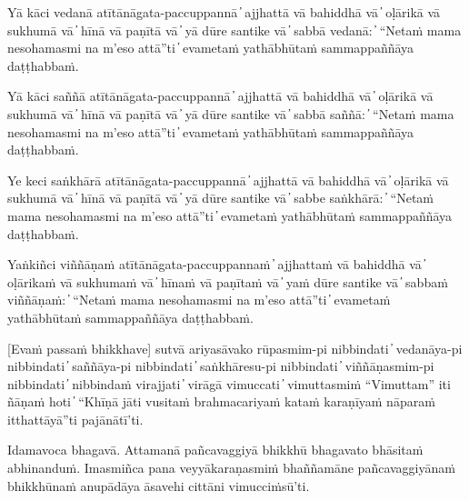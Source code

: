 Yā kāci vedanā atītānāgata-paccuppannā  ̓  ajjhattā vā bahiddhā vā  ̓  oḷārikā vā sukhumā vā  ̓  hīnā vā paṇītā vā  ̓  yā dūre santike vā  ̓  sabbā vedanā:  ̓  “Netaṁ mama nesohamasmi na m’eso attā”ti  ̓  evametaṁ yathābhūtaṁ sammappaññāya daṭṭhabbaṁ.

Yā kāci saññā atītānāgata-paccuppannā  ̓  ajjhattā vā bahiddhā vā  ̓  oḷārikā vā sukhumā vā  ̓  hīnā vā paṇītā vā  ̓  yā dūre santike vā  ̓  sabbā saññā:  ̓  “Netaṁ mama nesohamasmi na m’eso attā”ti  ̓  evametaṁ yathābhūtaṁ sammappaññāya daṭṭhabbaṁ.

Ye keci saṅkhārā atītānāgata-paccuppannā  ̓  ajjhattā vā bahiddhā vā  ̓  oḷārikā vā sukhumā vā  ̓  hīnā vā paṇītā vā  ̓  yā dūre santike vā  ̓  sabbe saṅkhārā:  ̓  “Netaṁ mama nesohamasmi na m’eso attā”ti  ̓  evametaṁ yathābhūtaṁ sammappaññāya daṭṭhabbaṁ.

Yaṅkiñci viññāṇaṁ atītānāgata-paccuppannaṁ  ̓  ajjhattaṁ vā bahiddhā vā  ̓  oḷārikaṁ vā sukhumaṁ vā  ̓  hīnaṁ vā paṇītaṁ vā  ̓  yaṁ dūre santike vā  ̓  sabbaṁ viññāṇaṁ:  ̓  “Netaṁ mama nesohamasmi na m’eso attā”ti  ̓  evametaṁ yathābhūtaṁ sammappaññāya daṭṭhabbaṁ.

[Evaṁ passaṁ bhikkhave] sutvā ariyasāvako rūpasmim-pi nibbindati  ̓  vedanāya-pi nibbindati  ̓  saññāya-pi nibbindati  ̓  saṅkhāresu-pi nibbindati  ̓  viññāṇasmim-pi nibbindati  ̓  nibbindaṁ virajjati  ̓  virāgā vimuccati  ̓  vimuttasmiṁ “Vimuttam” iti ñāṇaṁ hoti  ̓  “Khīṇā jāti vusitaṁ brahmacariyaṁ kataṁ karaṇīyaṁ nāparaṁ itthattāyā”ti pajānātī’ti.

Idamavoca bhagavā. Attamanā pañcavaggiyā bhikkhū bhagavato bhāsitaṁ abhinanduṁ. Imasmiñca pana veyyākaraṇasmiṁ bhaññamāne pañcavaggiyānaṁ bhikkhūnaṁ anupādāya āsavehi cittāni vimucciṁsū’ti.

